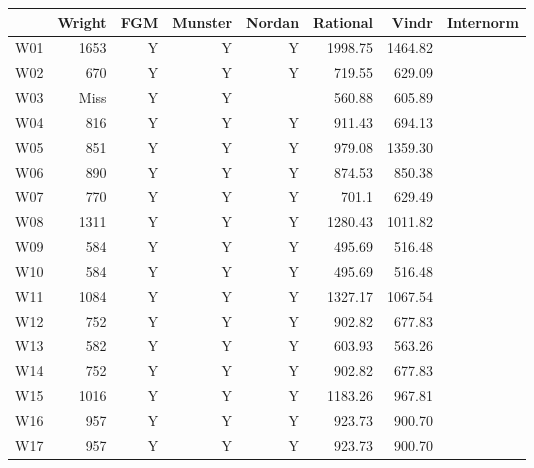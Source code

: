 \begin{tabular}{|p{4cm}||r|r|r|r|r|r|r|}
\hline
\rowcolor{LightCyan}
            &Wright     &FGM       &Munster &Nordan  &Rational   &Vindr  &Internorm         
\\ \hline
W01         &1653       &Y         &Y       &Y       &1998.75    &1464.82&                        
\\ \hline
W02         &670        &Y         &Y       &Y       &719.55     &629.09 &                            
\\ \hline
W03         &Miss       &Y         &Y       &        &560.88     &605.89 &                            
\\ \hline
W04         &816        &Y         &Y       &Y       &911.43     &694.13 &                     
\\ \hline
W05         &851        &Y         &Y       &Y       &979.08     &1359.30&                    
\\ \hline
W06         &890        &Y         &Y       &Y       &874.53     &850.38 &                    
\\ \hline
W07         &770        &Y         &Y       &Y       &701.1      &629.49 &                    
\\ \hline
W08         &1311       &Y         &Y       &Y       &1280.43    &1011.82&                     
\\ \hline
W09         &584        &Y         &Y       &Y       &495.69     &516.48 &                    
\\ \hline
W10         &584        &Y         &Y       &Y       &495.69     &516.48 &                     
\\ \hline
W11         &1084       &Y         &Y       &Y       &1327.17    &1067.54&                     
\\ \hline
W12         &752        &Y         &Y       &Y       &902.82     &677.83 &               
\\ \hline
W13         &582        &Y         &Y       &Y       &603.93     &563.26 &                   
\\ \hline
W14         &752        &Y         &Y       &Y       &902.82     &677.83 &                    
\\ \hline
W15         &1016       &Y         &Y       &Y       &1183.26    &967.81 &                     
\\ \hline
W16         &957        &Y         &Y       &Y       &923.73     &900.70 &                    
\\ \hline
W17         &957        &Y         &Y       &Y       &923.73     &900.70 &                    

\end{tabular}
